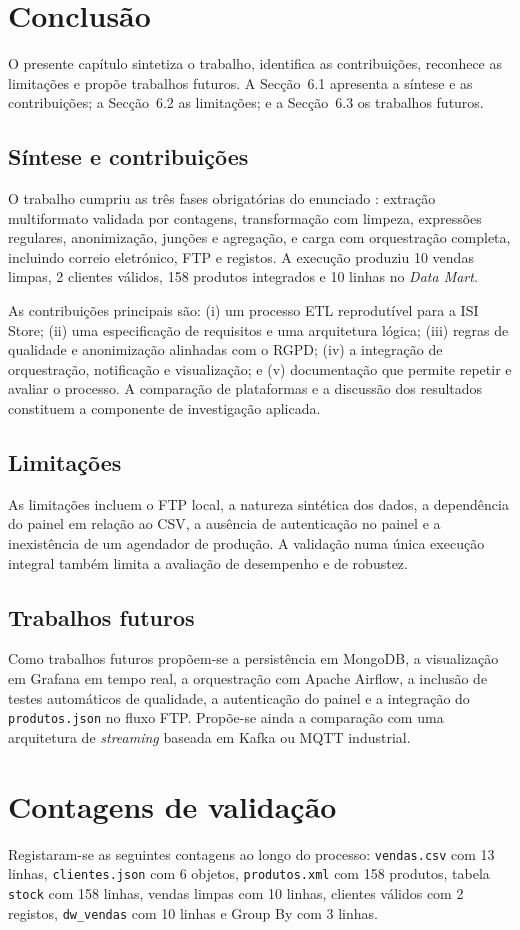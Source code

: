 \documentclass[11pt,a4paper]{article}
\begin{document}
\section{Conclusão}
O presente capítulo sintetiza o trabalho, identifica as contribuições, reconhece as limitações e propõe trabalhos futuros. A Secção~6.1 apresenta a síntese e as contribuições; a Secção~6.2 as limitações; e a Secção~6.3 os trabalhos futuros.

\subsection{Síntese e contribuições}
O trabalho cumpriu as três fases obrigatórias do enunciado \cite{ferreira2026enunciado}: extração multiformato validada por contagens, transformação com limpeza, expressões regulares, anonimização, junções e agregação, e carga com orquestração completa, incluindo correio eletrónico, FTP e registos. A execução produziu 10 vendas limpas, 2 clientes válidos, 158 produtos integrados e 10 linhas no \textit{Data Mart}.

As contribuições principais são: (i) um processo ETL reprodutível para a ISI Store; (ii) uma especificação de requisitos e uma arquitetura lógica; (iii) regras de qualidade e anonimização alinhadas com o RGPD; (iv) a integração de orquestração, notificação e visualização; e (v) documentação que permite repetir e avaliar o processo. A comparação de plataformas e a discussão dos resultados constituem a componente de investigação aplicada.

\subsection{Limitações}
As limitações incluem o FTP local, a natureza sintética dos dados, a dependência do painel em relação ao CSV, a ausência de autenticação no painel e a inexistência de um agendador de produção. A validação numa única execução integral também limita a avaliação de desempenho e de robustez.

\subsection{Trabalhos futuros}
Como trabalhos futuros propõem-se a persistência em MongoDB, a visualização em Grafana em tempo real, a orquestração com Apache Airflow, a inclusão de testes automáticos de qualidade, a autenticação do painel e a integração do \texttt{produtos.json} no fluxo FTP. Propõe-se ainda a comparação com uma arquitetura de \textit{streaming} baseada em Kafka ou MQTT industrial.

\clearpage



\appendix
\section{Contagens de validação}
Registaram-se as seguintes contagens ao longo do processo: \texttt{vendas.csv} com 13 linhas, \texttt{clientes.json} com 6 objetos, \texttt{produtos.xml} com 158 produtos, tabela \texttt{stock} com 158 linhas, vendas limpas com 10 linhas, clientes válidos com 2 registos, \texttt{dw\_vendas} com 10 linhas e Group By com 3 linhas.
\end{document}
